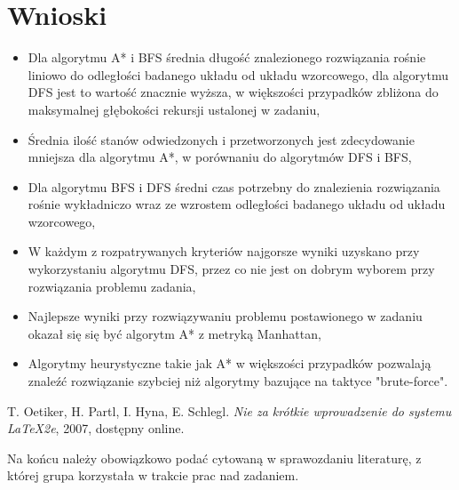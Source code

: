 \documentclass{classrep}
\begin{document}
\section{Wnioski}
{\color{black}
\begin{itemize}
  \item Dla algorytmu A* i BFS średnia długość znalezionego rozwiązania rośnie liniowo do odległości badanego układu od układu wzorcowego, dla algorytmu DFS jest to wartość znacznie wyższa, w większości przypadków zbliżona do maksymalnej głębokości rekursji ustalonej w zadaniu,
  \item Średnia ilość stanów odwiedzonych i przetworzonych jest zdecydowanie mniejsza dla algorytmu A*, w porównaniu do algorytmów DFS i BFS,
  \item Dla algorytmu BFS i DFS średni czas potrzebny do znalezienia rozwiązania rośnie wykładniczo wraz ze wzrostem odległości badanego układu od układu wzorcowego,
  \item W każdym z rozpatrywanych kryteriów najgorsze wyniki uzyskano przy wykorzystaniu algorytmu DFS, przez co nie jest on dobrym wyborem przy rozwiązania problemu zadania,
  \item Najlepsze wyniki przy rozwiązywaniu problemu postawionego w zadaniu okazał się się być algorytm A* z metryką Manhattan,
  \item Algorytmy heurystyczne takie jak A* w większości przypadków pozwalają znaleźć rozwiązanie szybciej niż algorytmy bazujące na taktyce "brute-force". \newline
\end{itemize}}

\begin{thebibliography}{0}
   T. Oetiker, H. Partl, I. Hyna, E. Schlegl.
    \textsl{Nie za krótkie wprowadzenie do systemu \LaTeX2e}, 2007, dostępny
    online.
\end{thebibliography}

{\color{blue}
Na końcu należy obowiązkowo podać cytowaną w sprawozdaniu literaturę, z której
grupa korzystała w trakcie prac nad zadaniem.}
\end{document}
